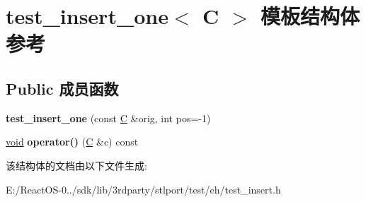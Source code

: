 \hypertarget{structtest__insert__one}{}\section{test\+\_\+insert\+\_\+one$<$ C $>$ 模板结构体 参考}
\label{structtest__insert__one}
\subsection*{Public 成员函数}
\begin{DoxyCompactItemize}
\item 
\mbox{\label{structtest__insert__one_a0aadeff5319a910a4e368916e40f9755}} 
{\bfseries test\+\_\+insert\+\_\+one} (const \hyperlink{struct_c}{C} \&orig, int pos=-\/1)
\item 
\mbox{\label{structtest__insert__one_a8258d8e5060a31c4e1b2fb1f7c40fa45}} 
\hyperlink{interfacevoid}{void} {\bfseries operator()} (\hyperlink{struct_c}{C} \&c) const
\end{DoxyCompactItemize}


该结构体的文档由以下文件生成\+:\begin{DoxyCompactItemize}
\item 
E\+:/\+React\+O\+S-\/0../sdk/lib/3rdparty/stlport/test/eh/test\+\_\+insert.\+h\end{DoxyCompactItemize}
